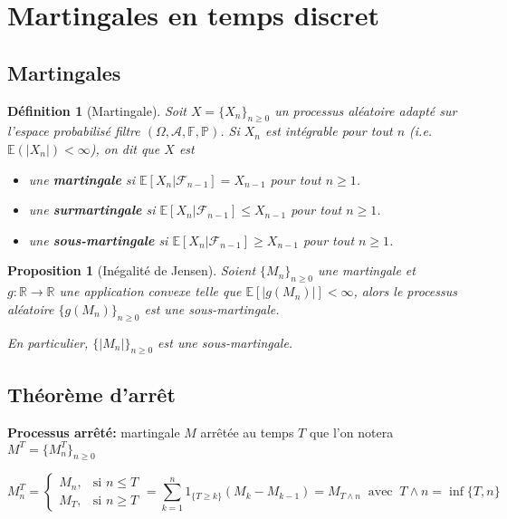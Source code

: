 \documentclass[10pt,a4paper,oneside]{article}
\newtheorem{proposition}{Proposition}
\newtheorem{definition}{Définition}
\begin{document}
\section{Martingales en temps discret}

\subsection{Martingales}

\begin{definition}[Martingale]
Soit $X = \{ X_n \}_{n \geq 0}$ un processus aléatoire adapté sur l'espace probabilisé filtre $(\Omega, \mathcal{A}, \mathbb{F}, \mathbb{P})$. Si $X_n$ est intégrable pour tout $n$ (i.e. $\mathbb{E}(|X_n|) < \infty$), on dit que $X$ est

\begin{itemize}
\item
une \textbf{martingale} si $\mathbb{E}[X_n | \mathcal{F}_{n - 1}] = X_{n - 1}$ pour tout $n \geq 1$.
\item
une \textbf{surmartingale} si $\mathbb{E}[X_n | \mathcal{F}_{n - 1}] \leq X_{n - 1}$ pour tout $n \geq 1$.
\item
une \textbf{sous-martingale} si $\mathbb{E}[X_n | \mathcal{F}_{n - 1}] \geq X_{n - 1}$ pour tout $n \geq 1$.
\end{itemize}
\end{definition}

\begin{proposition}[Inégalité de Jensen]
Soient $\{ M_n \}_{n \geq 0}$ une martingale et $g : \mathbb{R} \to \mathbb{R}$ une application convexe telle que $\mathbb{E}[|g(M_n)|] < \infty$, alors le processus aléatoire $\{ g(M_n) \}_{n \geq 0}$ est une sous-martingale.

En particulier, $\{ |M_n| \}_{n \geq 0}$ est une sous-martingale.
\end{proposition}

\subsection{Théorème d'arrêt}

\textbf{Processus arrêté:} martingale $M$ arrêtée au temps $T$ que l'on notera $M^T = \{ M_n^T \}_{n \geq 0}$

\[ M_n^T = \begin{cases}
M_n, &\text{si } n \leq T \\
M_T, &\text{si } n \geq T
\end{cases}
= \sum_{k = 1}^n 1_{\{ T \geq k \}}(M_k - M_{k - 1}) = M_{T \wedge n}\ \text{ avec }\ T \wedge n = \inf\{T,n\}
\]
\end{document}
